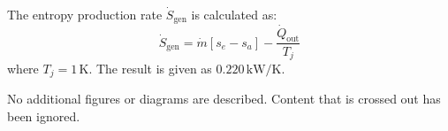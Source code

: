 The entropy production rate \( \dot{S}_{\text{gen}} \) is calculated as:  
\[
\dot{S}_{\text{gen}} = \dot{m} \left[ s_e - s_a \right] - \frac{\dot{Q}_{\text{out}}}{T_j}
\]  
where \( T_j = 1 \, \text{K} \).  
The result is given as \( 0.220 \, \text{kW/K} \).

No additional figures or diagrams are described. Content that is crossed out has been ignored.